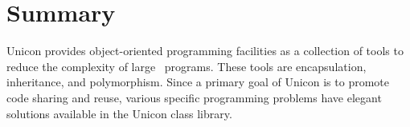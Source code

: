\section{Summary}

Unicon provides object-oriented programming facilities as a collection
of tools to reduce the complexity of large \ programs. These tools are
encapsulation, inheritance, and polymorphism. Since a primary goal of
Unicon is to promote code sharing and reuse, various specific
programming problems have elegant solutions available in the Unicon
class library.

